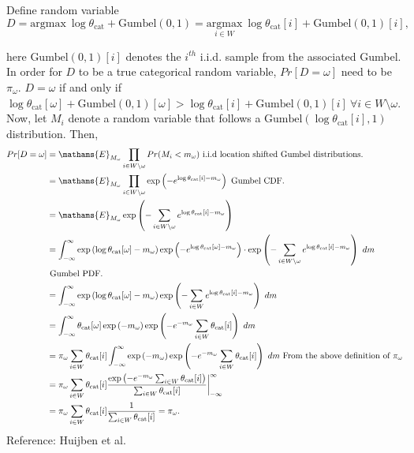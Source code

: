 \documentclass[
  11pt,
  letterpaper,
]{article}
\begin{document}
Define random variable \[
D = \text{argmax} \ \log \theta_\text{cat} + \text{Gumbel}(0, 1) = \underset{i \in W}{\text{argmax}} \ \log \theta_\text{cat}[i] + \text{Gumbel}(0, 1)[i], 
\]

here \(\text{Gumbel}(0, 1)[i]\) denotes the \(i^{th}\) i.i.d. sample
from the associated Gumbel. In order for \(D\) to be a true categorical
random variable, \(Pr[D = \omega]\) need to be \(\pi_\omega\).
\(D = \omega\) if and only if
\(\log \theta_\text{cat}[\omega] + \text{Gumbel}(0,1)[\omega] > \log \theta_\text{cat}[i] + \text{Gumbel}(0, 1)[i] \ \forall i \in W \setminus \omega\).
Now, let \(M_i\) denote a random variable that follows a
\(\text{Gumbel}(\log \theta_\text{cat}[i], 1)\) distribution. Then,
\begin{align*}
        Pr[D = \omega] 
            &= \mathams{E}_{M_\omega} 
                \prod_{i \in W \setminus \omega} Pr(M_i < m_\omega) 
                \text{ i.i.d location shifted Gumbel distributions.} \\ 
            &= \mathams{E}_{M_\omega} 
                \prod_{i \in W \setminus \omega} \exp 
                    \left(-e^{\log \theta_\text{cat}[i] - m_\omega} \right)
                \text{ Gumbel CDF.} \\ 
            &= \mathams{E}_{M_\omega} 
                \exp \left(-\sum_{i \in W \setminus \omega}
                e^{\log \theta_\text{cat}[i] - m_\omega} \right) \\ 
            &= \int_{-\infty}^{\infty}
                \exp \left( \log \theta_\text{cat}[\omega] - m_\omega \right) 
                \exp \left(-e^{\log \theta_\text{cat}[\omega] - m_\omega} \right) \cdot 
                \exp \left (-\sum_{i \in W \setminus \omega}
                e^{\log \theta_\text{cat}[i] - m_\omega} \right) \ dm \\
                &\text{ Gumbel PDF.} \\
            &= \int_{-\infty}^{\infty}
                \exp \left( \log \theta_\text{cat}[\omega] - m_\omega \right) 
                \exp \left (-\sum_{i \in W}
                e^{\log \theta_\text{cat}[i] - m_\omega} \right) \ dm \\
            &= \int_{-\infty}^{\infty}
                \theta_\text{cat}[\omega] 
                \exp \left( -m_\omega \right) 
                \exp \left( -e^{-m_\omega} \sum_{i \in W}
                    \theta_\text{cat}[i]  \right) \ dm \\
            &= \pi_\omega \sum_{i \in W} \theta_\text{cat}[i]
            \int_{-\infty}^{\infty}
                \exp \left( -m_\omega \right) 
                \exp \left( -e^{-m_\omega} \sum_{i \in W}
                    \theta_\text{cat}[i]  \right) \ dm 
                    \text{ From the above definition of } \pi_\omega \\
            &= \pi_\omega \sum_{i \in W} \theta_\text{cat}[i]
                \dfrac{\exp\left( -e^{-m_\omega} \sum_{i \in W} \theta_\text{cat}[i] \right)
                    }{\sum_{i \in W} \theta_\text{cat}[i]} \bigg|_{-\infty}^\infty \\ 
            &= \pi_\omega \sum_{i \in W} \theta_\text{cat}[i]
                \dfrac{1}{\sum_{i \in W} \theta_\text{cat}[i]} = \pi_\omega. 
    \end{align*} Reference: Huijben et al.
\end{document}
